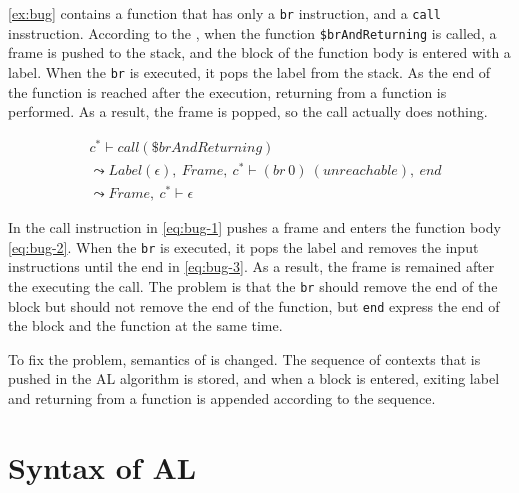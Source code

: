 \cref{ex:bug} contains a function that has only a \texttt{br} instruction, and a
\texttt{call} insstruction.
According to the \officialp{}, when the function \texttt{\$brAndReturning} is
called, a frame is pushed to the stack, and the block of the function
body is entered with a label.
When the \texttt{br} is executed, it pops the label from the stack.
As the end of the function is reached after the execution, returning from a
function is performed.
As a result, the frame is popped, so the call actually does nothing.


\begin{align}
  &c^* \vdash call(\$brAndReturning) \label{eq:bug-1} \\
&\leadsto
  Label(\epsilon), ~ Frame, ~ c^* \vdash (br ~ 0) ~ (unreachable), ~ end \label{eq:bug-2} \\
&\leadsto
  Frame, ~ c^* \vdash \epsilon \label{eq:bug-3}
\end{align}

In \spectecp{} the call instruction in \cref{eq:bug-1} pushes a frame and
enters the function body \cref{eq:bug-2}.
When the \texttt{br} is executed, it pops the label and removes the input
instructions until the end in \cref{eq:bug-3}.
As a result, the frame is remained after the executing the call.
The problem is that the \texttt{br} should remove the end of the block but
should not remove the end of the function, but \texttt{end} express the end of
the block and the function at the same time.


To fix the problem, semantics of \enteri is changed.
The sequence of contexts that is pushed in the AL algorithm is stored,
and when a block is entered, exiting label and returning from a function is
appended according to the sequence.



\newcommand{\seq}[1]{#1^*}

\section{Syntax of AL}
\label{syntax}

